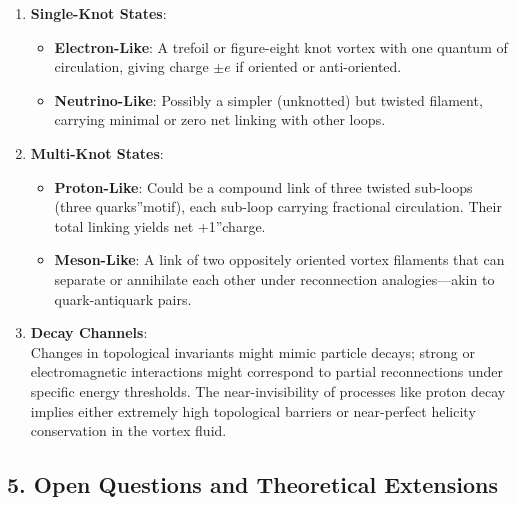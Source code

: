 \begin{enumerate}
    \item \textbf{Single-Knot States}:
    \begin{itemize}
        \item \textbf{Electron-Like}: A trefoil or figure-eight knot vortex with one quantum of circulation, giving charge \(\pm e\) if oriented or anti-oriented.
        \item \textbf{Neutrino-Like}: Possibly a simpler (unknotted) but twisted filament, carrying minimal or zero net linking with other loops.
    \end{itemize}
    \item \textbf{Multi-Knot States}:
    \begin{itemize}
        \item \textbf{Proton-Like}: Could be a compound link of three twisted sub-loops (\grqq three quarks\textquotedblright motif), each sub-loop carrying fractional circulation. Their total linking yields net \grqq +1\textquotedblright charge.
        \item \textbf{Meson-Like}: A link of two oppositely oriented vortex filaments that can separate or annihilate each other under reconnection analogies—akin to quark-antiquark pairs.
    \end{itemize}
    \item \textbf{Decay Channels}: \\
    Changes in topological invariants might mimic particle decays; strong or electromagnetic interactions might correspond to partial reconnections under specific energy thresholds. The near-invisibility of processes like proton decay implies either extremely high topological barriers or near-perfect helicity conservation in the vortex fluid.
\end{enumerate}

\subsection*{5. Open Questions and Theoretical Extensions}

